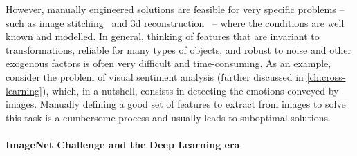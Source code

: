 However, manually engineered solutions are feasible for very specific problems -- such as image stitching~\cite{brown2007automatic} and 3d reconstruction~\cite{schonberger2016structure} -- where the conditions are well known and modelled.
In general, thinking of features that are invariant to transformations, reliable for many types of objects, and robust to noise and other exogenous factors is often very difficult and time-consuming.
As an example, consider the problem of visual sentiment analysis (further discussed in \ref{ch:cross-learning}), which, in a nutshell, consists in detecting the emotions conveyed by images.
Manually defining a good set of features to extract from images to solve this task is a cumbersome process and usually leads to suboptimal solutions.

\paragraph{ImageNet Challenge and the Deep Learning era}

